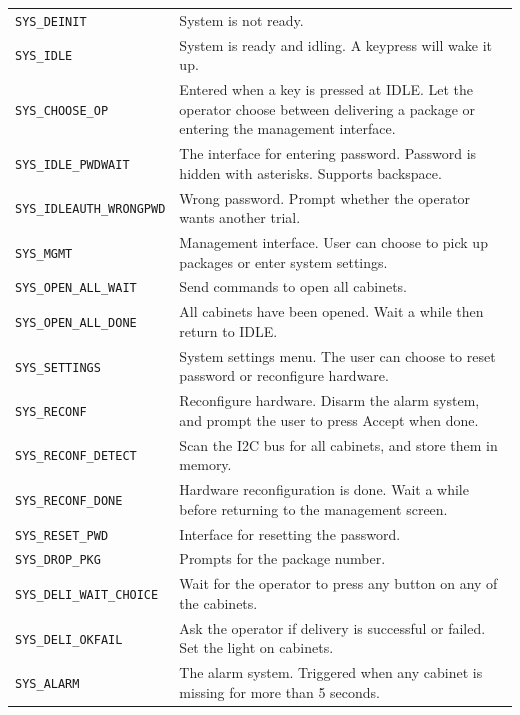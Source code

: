 \documentclass{article}
\begin{document}
\begin{tabular}{|| l | p{13cm} ||}
\texttt{SYS\_DEINIT} & System is not ready. \\
\texttt{SYS\_IDLE} & System is ready and idling. A keypress will wake it up. \\
\texttt{SYS\_CHOOSE\_OP} & Entered when a key is pressed at IDLE. Let the operator choose between delivering a package or entering the management interface. \\
\texttt{SYS\_IDLE\_PWDWAIT} & The interface for entering password. Password is hidden with asterisks. Supports backspace.\\
\texttt{SYS\_IDLEAUTH\_WRONGPWD} & Wrong password. Prompt whether the operator wants another trial. \\
\texttt{SYS\_MGMT} & Management interface. User can choose to pick up packages or enter system settings. \\
\texttt{SYS\_OPEN\_ALL\_WAIT} & Send commands to open all cabinets. \\
\texttt{SYS\_OPEN\_ALL\_DONE} & All cabinets have been opened. Wait a while then return to IDLE. \\
\texttt{SYS\_SETTINGS} & System settings menu. The user can choose to reset password or reconfigure hardware. \\
\texttt{SYS\_RECONF} & Reconfigure hardware. Disarm the alarm system, and prompt the user to press Accept when done. \\
\texttt{SYS\_RECONF\_DETECT} & Scan the I2C bus for all cabinets, and store them in memory. \\
\texttt{SYS\_RECONF\_DONE} & Hardware reconfiguration is done. Wait a while before returning to the management screen. \\
\texttt{SYS\_RESET\_PWD} & Interface for resetting the password. \\
\texttt{SYS\_DROP\_PKG} & Prompts for the package number. \\
\texttt{SYS\_DELI\_WAIT\_CHOICE} & Wait for the operator to press any button on any of the cabinets. \\
\texttt{SYS\_DELI\_OKFAIL} & Ask the operator if delivery is successful or failed. Set the light on cabinets. \\
\texttt{SYS\_ALARM} & The alarm system. Triggered when any cabinet is missing for more than 5 seconds.
\end{tabular}
\end{document}
